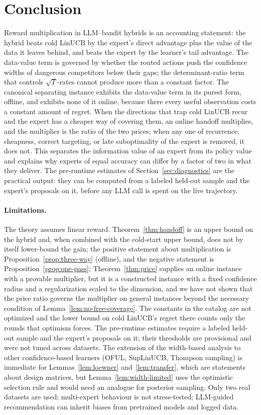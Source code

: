 \documentclass{article}
\theoremstyle{definition}
\theoremstyle{remark}
\theoremstyle{remark}
\begin{document}
\section{Conclusion}
\label{sec:conclusion}

Reward multiplication in LLM--bandit hybrids is an accounting statement: the
hybrid beats cold LinUCB by the expert's direct advantage plus the value of the
data it leaves behind, and beats the expert by the learner's tail advantage.
The data-value term is governed by whether the routed actions push the
confidence widths of dangerous competitors below their gaps; the
determinant-ratio term that controls $\sqrt T$-rates cannot produce more than
a constant factor. The canonical separating instance exhibits the data-value
term in its purest form, offline, and exhibits none of it online, because
there every useful observation costs a constant amount of regret. When the
directions that trap cold LinUCB recur and the expert has a cheaper way of
covering them, an online handoff multiplies, and the multiplier is the ratio
of the two prices; when any one of recurrence, cheapness, correct targeting,
or late suboptimality of the expert is removed, it does not. This
separates the information value of an expert from its policy value and
explains why experts of equal accuracy can differ by a factor of two in what
they deliver. The pre-runtime estimates of Section~\ref{sec:diagnostics} are
the practical output: they can be computed from a labeled held-out sample
and the expert's proposals on it, before any LLM call is spent on the live
trajectory.

\paragraph{Limitations.}
The theory assumes linear reward. Theorem~\ref{thm:handoff} is an upper bound
on the hybrid and, when combined with the cold-start upper bound, does not by
itself lower-bound the gain; the positive statement about multiplication is
Proposition~\ref{prop:three-way} (offline), and the negative statement is
Proposition~\ref{prop:one-pass}; Theorem~\ref{thm:price} supplies an online
instance with a provable multiplier, but it is a constructed instance with a
fixed confidence radius and a regularization scaled to the dimension, and we
have not shown that the price ratio governs the multiplier on general
instances beyond the necessary condition of Lemma~\ref{lem:no-free-coverage}.
The constants in the catalog are not optimized and the lower bound on cold
LinUCB's regret there counts only the rounds that optimism forces. The pre-runtime estimates require a labeled held-out sample and the
expert's proposals on it; their thresholds are provisional and were not tuned
across datasets. The extension of the width-based analysis to other
confidence-based learners (OFUL, SupLinUCB, Thompson sampling) is immediate
for Lemmas~\ref{lem:loewner} and~\ref{lem:transfer}, which are statements
about design matrices, but Lemma~\ref{lem:width-limited} uses the optimistic
selection rule and would need an analogue for posterior sampling. Only two
real datasets are used; multi-expert behaviour is not stress-tested;
LLM-guided recommendation can inherit biases from pretrained models and
logged data.
\end{document}
